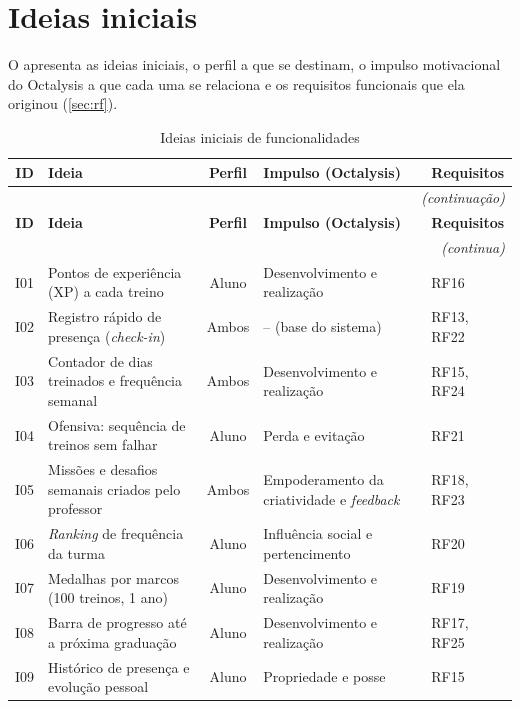 \section{Ideias iniciais}
\label{sec:ideias}

O  apresenta as ideias iniciais, o perfil a que se
destinam, o impulso motivacional do Octalysis \cite{chou2015} a que cada
uma se relaciona e os requisitos funcionais que ela originou
(\autoref{sec:rf}).

\begin{quadrolongo}
\begin{longtable}{|c|p{4.6cm}|c|p{3.9cm}|p{2.0cm}|}
  \caption{Ideias iniciais de funcionalidades}\label{qua:ideias}\\
  \hline
  \textbf{ID} & \textbf{Ideia} & \textbf{Perfil} & \textbf{Impulso (Octalysis)} & \textbf{Requisitos} \\ \hline
\endfirsthead
  \multicolumn{5}{r}{\textit{(continuação)}}\\
  \hline
  \textbf{ID} & \textbf{Ideia} & \textbf{Perfil} & \textbf{Impulso (Octalysis)} & \textbf{Requisitos} \\ \hline
\endhead
  \multicolumn{5}{r}{\textit{(continua)}}\\
\endfoot
\endlastfoot
    I01 & Pontos de experiência (XP) a cada treino & Aluno & Desenvolvimento e realização & RF16 \\ \hline
    I02 & Registro rápido de presença (\textit{check-in}) & Ambos & -- (base do sistema) & RF13, RF22 \\ \hline
    I03 & Contador de dias treinados e frequência semanal & Ambos & Desenvolvimento e realização & RF15, RF24 \\ \hline
    I04 & Ofensiva: sequência de treinos sem falhar & Aluno & Perda e evitação & RF21 \\ \hline
    I05 & Missões e desafios semanais criados pelo professor & Ambos & Empoderamento da criatividade e \textit{feedback} & RF18, RF23 \\ \hline
    I06 & \textit{Ranking} de frequência da turma & Aluno & Influência social e pertencimento & RF20 \\ \hline
    I07 & Medalhas por marcos (100 treinos, 1 ano) & Aluno & Desenvolvimento e realização & RF19 \\ \hline
    I08 & Barra de progresso até a próxima graduação & Aluno & Desenvolvimento e realização & RF17, RF25 \\ \hline
    I09 & Histórico de presença e evolução pessoal & Aluno & Propriedade e posse & RF15 \\ \hline

\end{longtable}
\end{quadrolongo}
